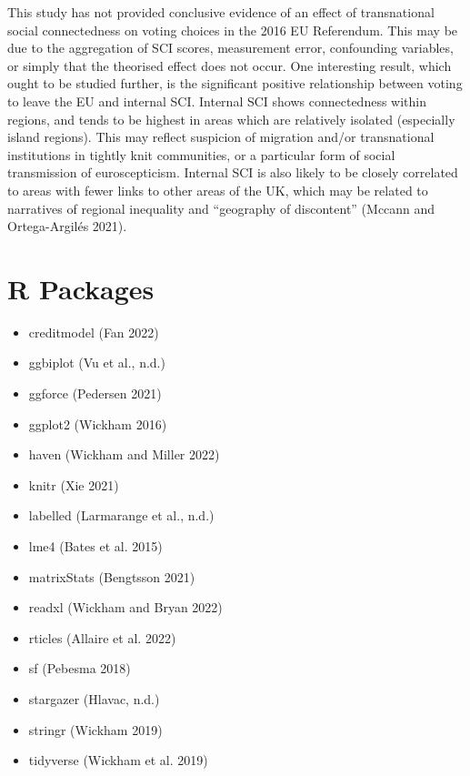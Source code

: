 \documentclass{article}
\providecommand{\tightlist}{%
  \setlength{\itemsep}{0pt}\setlength{\parskip}{0pt}}
\begin{document}
This study has not provided conclusive evidence of an effect of
transnational social connectedness on voting choices in the 2016 EU
Referendum. This may be due to the aggregation of SCI scores,
measurement error, confounding variables, or simply that the theorised
effect does not occur. One interesting result, which ought to be studied
further, is the significant positive relationship between voting to
leave the EU and internal SCI. Internal SCI shows connectedness within
regions, and tends to be highest in areas which are relatively isolated
(especially island regions). This may reflect suspicion of migration
and/or transnational institutions in tightly knit communities, or a
particular form of social transmission of euroscepticism. Internal SCI
is also likely to be closely correlated to areas with fewer links to
other areas of the UK, which may be related to narratives of regional
inequality and ``geography of discontent'' (Mccann and Ortega-Argilés
2021).

\hypertarget{r-packages}{%
\section*{R Packages}\label{r-packages}}

\begin{itemize}
\tightlist
\item
  creditmodel (Fan 2022)
\item
  ggbiplot (Vu et al., n.d.)
\item
  ggforce (Pedersen 2021)
\item
  ggplot2 (Wickham 2016)
\item
  haven (Wickham and Miller 2022)
\item
  knitr (Xie 2021)
\item
  labelled (Larmarange et al., n.d.)
\item
  lme4 (Bates et al. 2015)
\item
  matrixStats (Bengtsson 2021)
\item
  readxl (Wickham and Bryan 2022)
\item
  rticles (Allaire et al. 2022)
\item
  sf (Pebesma 2018)
\item
  stargazer (Hlavac, n.d.)
\item
  stringr (Wickham 2019)
\item
  tidyverse (Wickham et al. 2019)
\end{itemize}
\end{document}
